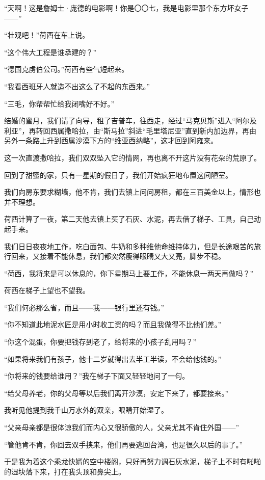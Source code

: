 \par “天啊！这是詹姆士·庞德的电影啊！你是〇〇七，我是电影里那个东方坏女子——”
\par “壮观吧！”荷西在车上说。
\par “这个伟大工程是谁承建的？”
\par “德国克虏伯公司。”荷西有些气短起来。
\par “我看西班牙人就造不出这么了不起的东西来。”
\par “三毛，你帮帮忙给我闭嘴好不好。”
\par 结婚的蜜月，我们请了向导，租了吉普车，往西走，经过“马克贝斯”进入“阿尔及利亚”，再转回西属撒哈拉，由“斯马拉”斜进“毛里塔尼亚”直到新内加边界，再由另外一条路上升到西属沙漠下方的“维亚西纳略”，这才回到阿雍来。
\par 这一次直渡撒哈拉，我们双双坠入它的情网，再也离不开这片没有花朵的荒原了。
\par 回到了甜蜜的家，只有一星期的假日了，我们开始疯狂地布置这间陋室。
\par 我们向房东要求糊墙，他不肯，我们去镇上问问房租，都在三百美金以上，情形也并不理想。
\par 荷西计算了一夜，第二天他去镇上买了石灰、水泥，再去借了梯子、工具，自己动起手来。
\par 我们日日夜夜地工作，吃白面包、牛奶和多种维他命维持体力，但是长途艰苦的旅行回来，又接着不能休息，我们都突然瘦得眼睛又大又亮，脚步不稳。
\par “荷西，我将来是可以休息的，你下星期马上要工作，不能休息一两天再做吗？”
\par 荷西在梯子上望也不望我。
\par “我们何必那么省，而且——我——银行里还有钱。”
\par “你不知道此地泥水匠是用小时收工资的吗？而且我做得不比他们差。”
\par “你这个混蛋，你要把钱存到老了，给将来的小孩子乱用吗？”
\par “如果将来我们有孩子，他十二岁就得出去半工半读，不会给他钱的。”
\par “你将来的钱要给谁用？”我在梯子下面又轻轻地问了一句。
\par “给父母养老，你的父母等以后我们离开沙漠，安定下来了，都要接来。”
\par 我听见他提到我千山万水外的双亲，眼睛开始湿了。
\par “父亲母亲都是很体谅我们而内心又很骄傲的人，父亲尤其不肯住外国——”
\par “管他肯不肯，你回去双手挟来，他们再要逃回台湾，也是很久以后的事了。”
\par 于是我为着这个乘龙快婿的空中楼阁，只好再努力调石灰水泥，梯子上不时有啪啪的湿块落下来，打在我头顶和鼻尖上。
